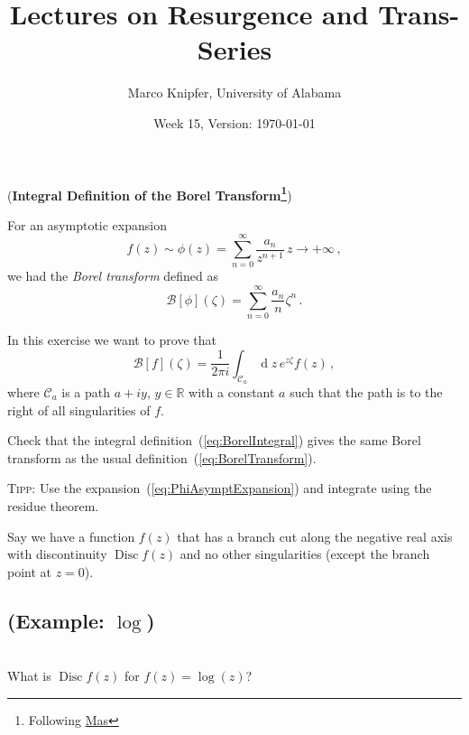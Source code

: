 \documentclass{exam}
\title{Lectures on Resurgence and Trans-Series}
\author{Marco Knipfer, University of Alabama}
\date{Week 15, Version: \today}
\DeclareMathOperator{\diff}{d}
\DeclareMathOperator*{\Disc}{Disc}
\newcommand{\calB}{\mathcal{B}}
\begin{document}
\maketitle

\begin{questions}
    \setcounter{question}{10}
    \question (\textbf{Integral Definition of the Borel Transform\footnote{Following \href{http://arxiv.org/abs/1904.07217}{Mas}}})

    For an asymptotic expansion
    \begin{equation}
        f(z) \sim \phi(z) = \sum_{n=0}^\infty \frac{a_n}{z^{n+1}}\, z\to+\infty\,,
        \label{eq:PhiAsymptExpansion}
    \end{equation}
    we had the \textit{Borel transform} defined as
    \begin{equation}
        \calB[\phi](\zeta) = \sum_{n=0}^\infty \frac{a_n}{n} \zeta^n\,.
        \label{eq:BorelTransform}
    \end{equation}

    In this exercise we want to prove that
    \begin{equation}
        \calB[f](\zeta) = \frac{1}{2\pi i} \int_{\mathcal{C}_a} \diff\!z\, e^{z \zeta} f(z)\,,
        \label{eq:BorelIntegral}
    \end{equation}
    where $\mathcal{C}_a$ is a path $a+iy$, $y\in\mathbb{R}$ with a constant $a$ such that the path is to the right
    of all singularities of $f$.

    Check that the integral definition~(\ref{eq:BorelIntegral}) gives the same Borel transform as the usual
    definition~(\ref{eq:BorelTransform}).

    \textsc{Tipp}: Use the expansion~(\ref{eq:PhiAsymptExpansion}) and integrate using the residue theorem.

    \label{q:Cauchy}
    
    Say we have a function $f(z)$ that has a branch cut along the negative real axis with discontinuity $\Disc f(z)$
    and no other singularities (except the branch point at $z=0$).
    \begin{parts}
        \part{(Example: $\log$)}\\
        What is $\Disc f(z)$ for $f(z) = \log(z)$?


\end{parts}
\end{questions}
\end{document}
